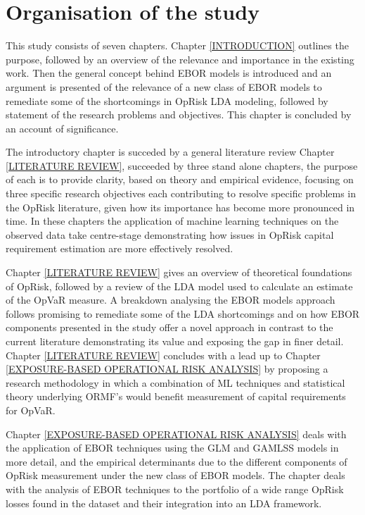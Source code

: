 \documentclass{DissertateUSU}
\begin{document}
\section{Organisation of the study}
\label{sec:Organisation of the study}

This study consists of seven chapters. Chapter \ref{INTRODUCTION}
outlines the purpose, followed by an overview of the relevance and
importance in the existing work. Then the general concept behind EBOR
models is introduced and an argument is presented of the relevance of a
new class of EBOR models to remediate some of the shortcomings in OpRisk
LDA modeling, followed by statement of the research problems and
objectives. This chapter is concluded by an account of
significance.\medskip

The introductory chapter is succeded by a general literature review
Chapter \ref{LITERATURE REVIEW}, succeeded by three stand alone
chapters, the purpose of each is to provide clarity, based on theory and
empirical evidence, focusing on three specific research objectives each
contributing to resolve specific problems in the OpRisk literature,
given how its importance has become more pronounced in time. In these
chapters the application of machine learning techniques on the observed
data take centre-stage demonstrating how issues in OpRisk capital
requirement estimation are more effectively resolved.\medskip

Chapter \ref{LITERATURE REVIEW} gives an overview of theoretical
foundations of OpRisk, followed by a review of the LDA model used to
calculate an estimate of the OpVaR measure. A breakdown analysing the
EBOR models approach follows promising to remediate some of the LDA
shortcomings and on how EBOR components presented in the study offer a
novel approach in contrast to the current literature demonstrating its
value and exposing the gap in finer detail. Chapter
\ref{LITERATURE REVIEW} concludes with a lead up to Chapter
\ref{EXPOSURE-BASED OPERATIONAL RISK ANALYSIS} by proposing a research
methodology in which a combination of ML techniques and statistical
theory underlying ORMF's would benefit measurement of capital
requirements for OpVaR.\medskip

Chapter \ref{EXPOSURE-BASED OPERATIONAL RISK ANALYSIS} deals with the
application of EBOR techniques using the GLM and GAMLSS models in more
detail, and the empirical determinants due to the different components
of OpRisk measurement under the new class of EBOR models. The chapter
deals with the analysis of EBOR techniques to the portfolio of a wide
range OpRisk losses found in the dataset and their integration into an
LDA framework.
\end{document}
